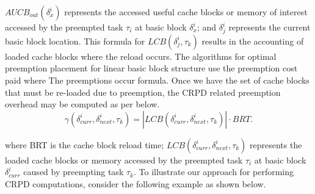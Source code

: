 \noindent
\begin{math}\textit{AUCB}_{out}(\delta_{x}^{i})\end{math} represents the accessed useful cache blocks or memory of interest accessed by the preempted task \begin{math}\tau_{i}\end{math} at basic block \begin{math}\delta_{x}^{i}\end{math}; and \begin{math}\delta_{j}^{i}\end{math} represents the current basic block location.  This formula for \begin{math}\textit{LCB}(\delta_{j}^{i},\tau_{k})\end{math} results in the accounting of loaded cache blocks where the reload occurs.  The algorithms for optimal preemption placement for linear basic block structure use the preemption cost paid where The preemptions occur formula.  Once we have the set of cache blocks that must be re-loaded due to preemption, the CRPD related preemption overhead may be computed as per below.
\begin{equation}\label{eqn:crpd-formula}
    \gamma(\delta_{curr}^{i},\delta_{next}^{i},\tau_{k}) = | \textit{LCB}(\delta_{curr}^{i},\delta_{next}^{i},\tau_{k}) | \cdot BRT.
\end{equation}

\noindent where BRT is the cache block reload time; \begin{math}\textit{LCB}(\delta_{curr}^{i},\delta_{next}^{i},\tau_{k})\end{math} represents the loaded cache blocks or memory accessed by the preempted task \begin{math}\tau_{i}\end{math} at basic block \begin{math}\delta_{curr}^{i}\end{math} caused by preempting task \begin{math}\tau_{k}\end{math}.
\newline
\newline
\noindent
To illustrate our approach for performing CRPD computations, consider the following example as shown below.


